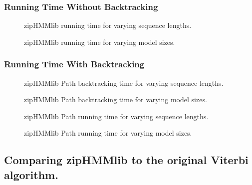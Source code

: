\subsubsection{Running Time Without Backtracking}
\label{sec:running-time-without}

\begin{figure}[H]
  \centering
  
  \caption{zipHMMlib running time for varying sequence lengths.}
  \label{fig:assymptotic_viterbi_n}
\end{figure}

\begin{figure}[H]
  \centering
  
  \caption{zipHMMlib running time for varying model sizes.}
  \label{fig:assymptotic_viterbi_k}
\end{figure}

\subsubsection{Running Time With Backtracking}
\label{sec:running-time-with-1}

\begin{figure}[H]
  \centering
  
  \caption{zipHMMlib Path backtracking time for varying sequence lengths.}
  \label{fig:assymptotic_viterbi_backtrack_n}
\end{figure}

\begin{figure}[H]
  \centering
  
  \caption{zipHMMlib Path backtracking time for varying model sizes.}
  \label{fig:assymptotic_viterbi_backtrack_k}
\end{figure}

\begin{figure}[H]
  \centering
  
  \caption{zipHMMlib Path running time for varying sequence lengths.}
  \label{fig:assymptotic_viterbi_path_n}
\end{figure}

\begin{figure}[H]
  \centering
  
  \caption{zipHMMlib Path running time for varying model sizes.}
  \label{fig:assymptotic_viterbi_path_k}
\end{figure}

\subsection{Comparing zipHMMlib to the original Viterbi algorithm.}
\label{sec:comp-ziphmml-orig}


